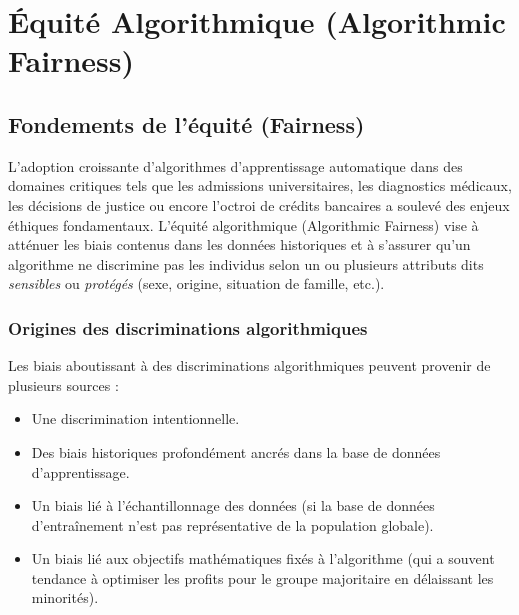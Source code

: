 \chapter{Équité Algorithmique (Algorithmic Fairness)}

\section{Fondements de l'équité (Fairness)}

L'adoption croissante d'algorithmes d'apprentissage automatique dans des domaines critiques tels que les admissions universitaires, les diagnostics médicaux, les décisions de justice ou encore l'octroi de crédits bancaires a soulevé des enjeux éthiques fondamentaux. L'équité algorithmique (Algorithmic Fairness) vise à atténuer les biais contenus dans les données historiques et à s'assurer qu'un algorithme ne discrimine pas les individus selon un ou plusieurs attributs dits \textit{sensibles} ou \textit{protégés} (sexe, origine, situation de famille, etc.).

\subsection{Origines des discriminations algorithmiques}
Les biais aboutissant à des discriminations algorithmiques peuvent provenir de plusieurs sources :
\begin{itemize}
    \item Une discrimination intentionnelle.
    \item Des biais historiques profondément ancrés dans la base de données d'apprentissage.
    \item Un biais lié à l'échantillonnage des données (si la base de données d'entraînement n'est pas représentative de la population globale).
    \item Un biais lié aux objectifs mathématiques fixés à l'algorithme (qui a souvent tendance à optimiser les profits pour le groupe majoritaire en délaissant les minorités).
\end{itemize}

